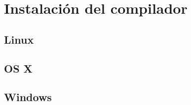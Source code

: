 \chapter{Instalación del compilador \Set}\label{app:installation_set_compiler}

	\section{Linux}


	\section{OS X}


	\section{Windows}